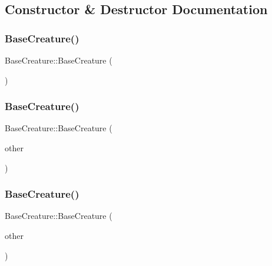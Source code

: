 \subsection{Constructor \& Destructor Documentation}
\mbox{\label{class_base_creature_aed503a9552a9d28233012f7a7b74d9bc}} 
\subsubsection{\texorpdfstring{Base\+Creature()}{BaseCreature()}\hspace{0.1cm}{\footnotesize\ttfamily [1/3]}}
{\footnotesize\ttfamily Base\+Creature\+::\+Base\+Creature (\begin{DoxyParamCaption}{ }\end{DoxyParamCaption})}

\mbox{\label{class_base_creature_adda13b6dcb4365d47210e34f2dcdc8ba}} 
\subsubsection{\texorpdfstring{Base\+Creature()}{BaseCreature()}\hspace{0.1cm}{\footnotesize\ttfamily [2/3]}}
{\footnotesize\ttfamily Base\+Creature\+::\+Base\+Creature (\begin{DoxyParamCaption}\item[{const \mbox{\hyperlink{class_base_creature}{Base\+Creature}} \&}]{other }\end{DoxyParamCaption})}

\mbox{\label{class_base_creature_aa496d94797fc52d3db909b78d8ee24d4}} 
\subsubsection{\texorpdfstring{Base\+Creature()}{BaseCreature()}\hspace{0.1cm}{\footnotesize\ttfamily [3/3]}}
{\footnotesize\ttfamily Base\+Creature\+::\+Base\+Creature (\begin{DoxyParamCaption}\item[{\mbox{\hyperlink{class_base_creature}{Base\+Creature}} \&}]{other }\end{DoxyParamCaption})}



